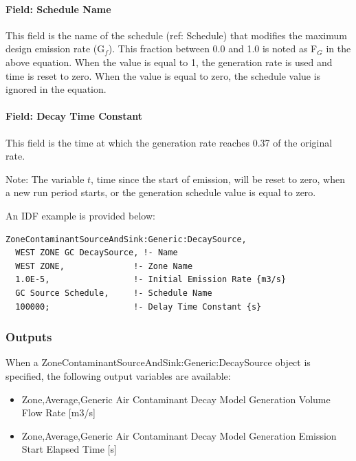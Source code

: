 \paragraph{Field: Schedule Name}\label{field-schedule-name-7}

This field is the name of the schedule (ref: Schedule) that modifies the maximum design emission rate (G\(_{f}\)). This fraction between 0.0 and 1.0 is noted as F\(_{G}\) in the above equation. When the value is equal to 1, the generation rate is used and time is reset to zero. When the value is equal to zero, the schedule value is ignored in the equation.

\paragraph{Field: Decay Time Constant}\label{field-decay-time-constant}

This field is the time at which the generation rate reaches 0.37 of the original rate.

\begin{callout}
  Note: The variable \(t\), time since the start of emission, will be reset to zero, when a new run period starts, or the generation schedule value is equal to zero.
\end{callout}

An IDF example is provided below:

\begin{lstlisting}
ZoneContaminantSourceAndSink:Generic:DecaySource,
  WEST ZONE GC DecaySource, !- Name
  WEST ZONE,              !- Zone Name
  1.0E-5,                 !- Initial Emission Rate {m3/s}
  GC Source Schedule,     !- Schedule Name
  100000;                 !- Delay Time Constant {s}
\end{lstlisting}

\subsubsection{Outputs}\label{outputs-10-003}

When a ZoneContaminantSourceAndSink:Generic:DecaySource object is specified, the following output variables are available:

\begin{itemize}
    \tightlist
  \item
    Zone,Average,Generic Air Contaminant Decay Model Generation Volume Flow Rate {[}m3/s{]}
  \item
    Zone,Average,Generic Air Contaminant Decay Model Generation Emission Start Elapsed Time {[}s{]}
\end{itemize}

